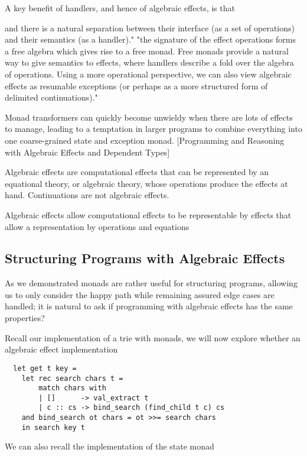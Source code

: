 A key benefit of handlers, and hence of algebraic effects,
is that

and there is a natural separation between
their interface (as a set of operations)
and
their semantics (as a handler)."
"the signature of the effect operations forms a free algebra which gives rise to a free monad.
Free monads provide a natural way to give semantics to effects,
where handlers describe a fold over the algebra of operations.
Using a more operational perspective,
we can also view algebraic effects as resumable exceptions
(or perhaps as a more structured form of delimited continuations)."
\cite{leijen2017type}

Monad transformers can quickly become unwieldy when there are lots of effects to manage,
leading to a temptation in larger programs to combine everything into one coarse-grained state and exception monad.
[Programming and Reasoning with Algebraic Effects and Dependent Types]

Algebraic effects are computational effects that can be represented by an equational theory, or algebraic theory, whose operations produce the effects at hand.
Continuations are not algebraic effects.

Algebraic effects allow computational effects to be representable by
effects that allow a representation by operations and equations

\subsection{Structuring Programs with Algebraic Effects}
As we demonstrated monads are rather useful for structuring programs,
allowing us to only consider the happy path while remaining assured
edge cases are handled;
it is natural to ask if programming with algebraic effects
has the same properties?

Recall our implementation of a trie with monads,
we will now explore whether an algebraic effect implementation
\begin{verbatim}
  let get t key =
    let rec search chars t =
        match chars with
        | []      -> val_extract t
        | c :: cs -> bind_search (find_child t c) cs
    and bind_search ot chars = ot >>= search chars
    in search key t
\end{verbatim}

We can also recall the implementation of the state monad

